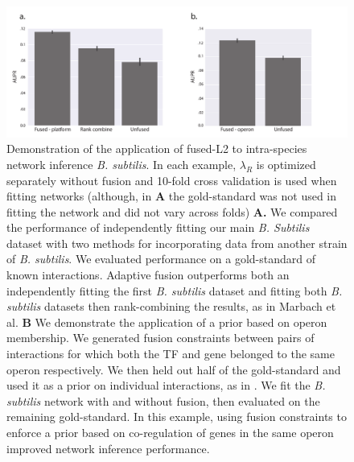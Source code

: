 \documentclass[11pt]{article}
\begin{document}
\pagebreak

\begin{figure}
\begin{center}
  \includegraphics[scale=0.30]{fig6.pdf}
  \caption{\label{fusedl2-real} Demonstration of the application of fused-L2 to intra-species network inference \textit{B. subtilis}. In each example, $\lambda_R$ is optimized separately without fusion and 10-fold cross validation is used when fitting networks (although, in \textbf{A} the gold-standard was not used in fitting the network and did not vary across folds) \textbf{A.} We compared the performance of independently fitting our main \textit{B. Subtilis} dataset with two methods for incorporating data from another strain of \textit{B. subtilis}. We evaluated performance on a gold-standard of known interactions. Adaptive fusion outperforms both an independently fitting the first \textit{B. subtilis} dataset and fitting both \textit{B. subtilis} datasets then rank-combining the results, as in Marbach et al. \textbf{B} We demonstrate the application of a prior based on operon membership. We generated fusion constraints between pairs of interactions for which both the TF and gene belonged to the same operon respectively. We then held out half of the gold-standard and used it as a prior on individual interactions, as in \cite{greenfield_robust_2013}. We fit the \textit{B. subtilis} network with and without fusion, then evaluated on the remaining gold-standard. In this example, using fusion constraints to enforce a prior based on co-regulation of genes in the same operon improved network inference performance.}
\end{center}
\end{figure}
\end{document}
